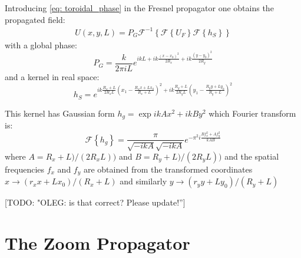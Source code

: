 \documentclass{iucr}              %
\newcommand{\todo}[1]{{\color{red}[TODO: "#1'']}}
\begin{document}
Introducing \ref{eq: toroidal_phase} in the Fresnel propagator one obtains the propagated field: 
\begin{equation}\label{eq: srw spherical phase}
	\begin{aligned}
	U(x, y, L) = P_G \mathcal{F}^{-1} \left\{  
	    \mathcal{F} \left\{ U_F \right\}
	    \mathcal{F} \left\{ h_S \right\}
	                                      \right\}
\end{aligned}
\end{equation}
with a global phase:
\begin{equation}\label{eq: srw global phase}
	P_G =  \frac{k}{2 \pi i L} e^{i k L + i k \frac{(x-x_0)^2}{2 R_x}+ i k \frac{(y-y_0)^2}{2 R_y}}
\end{equation}
and a kernel in real space: 
\begin{equation}\label{eq: srw global phase}
	h_S =  e^{
	  i k \frac{R_x+L}{2 R_x L} \left( x_1 - \frac{R_x x + L x_0}{R_x + L } \right) ^2 + 
	  i k \frac{R_y+L}{2 R_y L} \left( y_1 - \frac{R_y y + L y_0}{R_y + L } \right) ^2
	         }
\end{equation}

This kernel has Gaussian form $h_g = \exp{i k A x^2 + i k B y^2}$ which Fourier transform is: 
\begin{equation}
    \mathcal{F} \left\{ h_g \right\} = \frac{\pi}{\sqrt{-i k A}\sqrt{-i k A}} 
    e^{- \pi^2 i \frac{B f_x^2 + A f_y^2}{k A B}}
\end{equation}
where $A=R_x+L)/(2 R_x L))$ and $B=R_y+L)/(2 R_y L))$ and the spatial frequencies $f_x$ and $f_y$ are obtained from the transformed coordinates $x \rightarrow (r_x x + L x_0)/(R_x + L)$ and similarly $y \rightarrow (r_y y + L y_0)/(R_y + L)$

\todo{OLEG: is that correct? Please update!}


\section{The Zoom Propagator}
\label{appendix_zoom}
\end{document}
